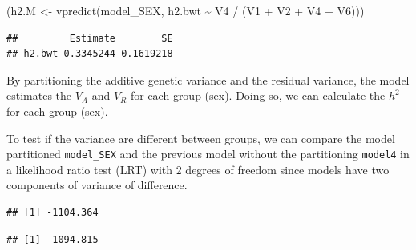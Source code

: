 \documentclass[
  12pt,
]{book}
\newenvironment{Shaded}{\begin{snugshade}}{\end{snugshade}}
\newcommand{\DecValTok}[1]{\textcolor[rgb]{0.00,0.00,0.81}{#1}}
\newcommand{\FunctionTok}[1]{\textcolor[rgb]{0.00,0.00,0.00}{#1}}
\newcommand{\NormalTok}[1]{#1}
\newcommand{\OtherTok}[1]{\textcolor[rgb]{0.56,0.35,0.01}{#1}}
\newcommand{\SpecialCharTok}[1]{\textcolor[rgb]{0.00,0.00,0.00}{#1}}
\begin{document}
\begin{Shaded}
\begin{Highlighting}[]
\NormalTok{(h2.M }\OtherTok{\textless{}{-}} \FunctionTok{vpredict}\NormalTok{(model\_SEX, h2.bwt }\SpecialCharTok{\textasciitilde{}}\NormalTok{ V4 }\SpecialCharTok{/}\NormalTok{ (V1 }\SpecialCharTok{+}\NormalTok{ V2 }\SpecialCharTok{+}\NormalTok{ V4 }\SpecialCharTok{+}\NormalTok{ V6)))}
\end{Highlighting}
\end{Shaded}

\begin{verbatim}
##         Estimate        SE
## h2.bwt 0.3345244 0.1619218
\end{verbatim}

By partitioning the additive genetic variance and the residual variance, the model estimates the \(V_A\) and \(V_R\) for each group (sex). Doing so, we can calculate the \(h^2\) for each group (sex).

To test if the variance are different between groups, we can compare the model partitioned \texttt{model\_SEX} and the previous model without the partitioning \texttt{model4} in a likelihood ratio test (LRT) with 2 degrees of freedom since models have two components of variance of difference.

\begin{Shaded}
\end{Shaded}

\begin{verbatim}
## [1] -1104.364
\end{verbatim}

\begin{Shaded}
\end{Shaded}

\begin{verbatim}
## [1] -1094.815
\end{verbatim}

\begin{Shaded}
\end{Shaded}
\end{document}
